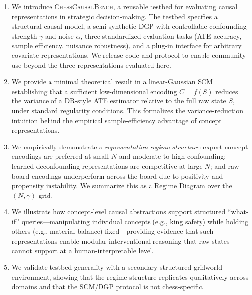 \documentclass[11pt]{article}
\begin{document}
\begin{enumerate}
\item We introduce \textsc{ChessCausalBench}, a reusable testbed for evaluating
causal representations in strategic decision-making. The testbed specifies a
structural causal model, a semi-synthetic DGP with controllable confounding strength
$\gamma$ and noise $\alpha$, three standardized evaluation tasks (ATE accuracy,
sample efficiency, nuisance robustness), and a plug-in interface for arbitrary
covariate representations. We release code and protocol to enable community use
beyond the three representations evaluated here.\cite{pearl2009causality,lemeire2005causalmodelsinchess}

\item We provide a minimal theoretical result in a linear-Gaussian SCM establishing
that a sufficient low-dimensional encoding $C = f(S)$ reduces the variance of a
DR-style ATE estimator relative to the full raw state $S$, under standard regularity
conditions. This formalizes the variance-reduction intuition behind the empirical
sample-efficiency advantage of concept representations.\cite{chernozhukov2018double}

\item We empirically demonstrate a \emph{representation-regime structure}: expert
concept encodings are preferred at small $N$ and moderate-to-high confounding;
learned deconfounding representations are competitive at large $N$; and raw board
encodings underperform across the board due to positivity and propensity instability.
We summarize this as a Regime Diagram over the $(N, \gamma)$
grid.\cite{chernozhukov2018double,kuang2020information,scholkopf2021towards}

\item We illustrate how concept-level causal abstractions support structured
``what-if'' queries---manipulating individual concepts (e.g., king safety) while
holding others (e.g., material balance) fixed---providing evidence that such
representations enable modular interventional reasoning that raw states cannot
support at a human-interpretable level.\cite{lemeire2005causalmodelsinchess,fortressesPaper,causalMaskingSpatial}

\item We validate testbed generality with a secondary structured-gridworld
environment, showing that the regime structure replicates qualitatively across
domains and that the SCM/DGP protocol is not chess-specific.
\end{enumerate}
\end{document}
